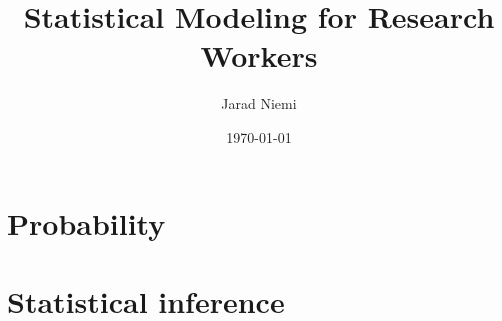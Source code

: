 \documentclass{book}
\title{Statistical Modeling for Research Workers}
\author{Jarad Niemi}
\date{\today}
\theoremstyle{definition}
\begin{document}
\maketitle
\newpage

\part{Probability}
% 

\newpage
\part{Statistical inference}


\end{document}
